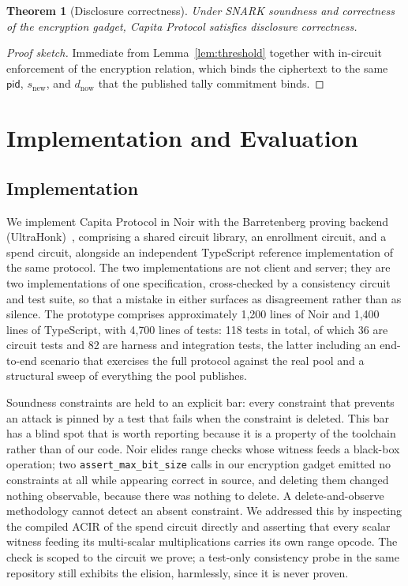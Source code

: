 \documentclass[11pt,a4paper]{article}
\theoremstyle{definition}
\theoremstyle{plain}
\newtheorem{theorem}{Theorem}
\theoremstyle{remark}
\newcommand{\pid}{\ensuremath{\mathsf{pid}}}
\begin{document}
\begin{theorem}[Disclosure correctness]
Under SNARK soundness and correctness of the encryption gadget, Capita Protocol satisfies disclosure correctness.
\end{theorem}
\begin{proof}[Proof sketch]
Immediate from Lemma~\ref{lem:threshold} together with in-circuit enforcement of the encryption relation, which binds the ciphertext to the same $\pid$, $s_{\mathrm{new}}$, and $d_{\mathrm{now}}$ that the published tally commitment binds.
\end{proof}

\section{Implementation and Evaluation}
\label{sec:eval}

\subsection{Implementation}

We implement Capita Protocol in Noir with the Barretenberg proving backend (UltraHonk)~\cite{noir}, comprising a shared circuit library, an enrollment circuit, and a spend circuit, alongside an independent TypeScript reference implementation of the same protocol. The two implementations are not client and server; they are two implementations of one specification, cross-checked by a consistency circuit and test suite, so that a mistake in either surfaces as disagreement rather than as silence. The prototype comprises approximately 1{,}200 lines of Noir and 1{,}400 lines of TypeScript, with 4{,}700 lines of tests: 118 tests in total, of which 36 are circuit tests and 82 are harness and integration tests, the latter including an end-to-end scenario that exercises the full protocol against the real pool and a structural sweep of everything the pool publishes.

Soundness constraints are held to an explicit bar: every constraint that prevents an attack is pinned by a test that fails when the constraint is deleted. This bar has a blind spot that is worth reporting because it is a property of the toolchain rather than of our code. Noir elides range checks whose witness feeds a black-box operation; two \texttt{assert\_max\_bit\_size} calls in our encryption gadget emitted no constraints at all while appearing correct in source, and deleting them changed nothing observable, because there was nothing to delete. A delete-and-observe methodology cannot detect an absent constraint. We addressed this by inspecting the compiled ACIR of the spend circuit directly and asserting that every scalar witness feeding its multi-scalar multiplications carries its own range opcode. The check is scoped to the circuit we prove; a test-only consistency probe in the same repository still exhibits the elision, harmlessly, since it is never proven.
\end{document}

